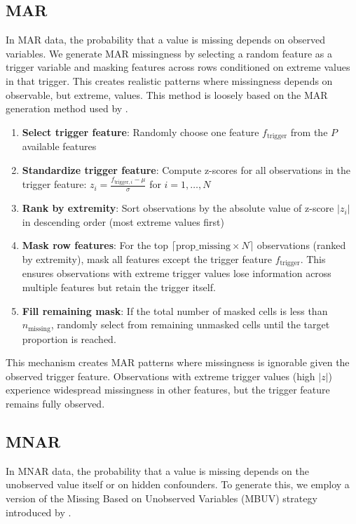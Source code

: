 \documentclass[preprint]{aastex631}
\begin{document}
\subsection{MAR}

In MAR data, the probability that a value is missing depends on observed variables. We generate MAR missingness by selecting a random feature as a trigger variable and masking features across rows conditioned on extreme values in that trigger. This creates realistic patterns where missingness depends on observable, but extreme, values. This method is loosely based on the MAR generation method used by \citet{toyeBenchmarkingMissingData2025}.

\begin{enumerate}
  \item \textbf{Select trigger feature}: Randomly choose one feature $f_{\text{trigger}}$ from the $P$ available features
  \item \textbf{Standardize trigger feature}: Compute z-scores for all observations in the trigger feature: $z_i = \frac{f_{\text{trigger},i} - \mu}{\sigma}$ for $i = 1, \ldots, N$
  \item \textbf{Rank by extremity}: Sort observations by the absolute value of z-score $|z_i|$ in descending order (most extreme values first)
  \item \textbf{Mask row features}: For the top $\lceil \text{prop\_missing} \times N \rceil$ observations (ranked by extremity), mask all features except the trigger feature $f_{\text{trigger}}$. This ensures observations with extreme trigger values lose information across multiple features but retain the trigger itself.
  \item \textbf{Fill remaining mask}: If the total number of masked cells is less than $n_{\text{missing}}$, randomly select from remaining unmasked cells until the target proportion is reached.
\end{enumerate}

This mechanism creates MAR patterns where missingness is ignorable given the observed trigger feature. Observations with extreme trigger values (high $|z|$) experience widespread missingness in other features, but the trigger feature remains fully observed.

\subsection{MNAR}

In MNAR data, the probability that a value is missing depends on the unobserved value itself or on hidden confounders. To generate this, we employ a version of the Missing Based on Unobserved Variables (MBUV) strategy introduced by \citet{pereiraImputationDataMissing2024}.
\end{document}
